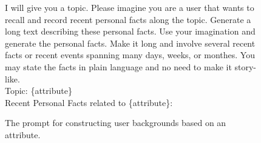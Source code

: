 \begin{figure}[t]
 \begin{tcolorbox}
 I will give you a topic. Please imagine you are a user that wants to recall and record recent personal facts along the topic. Generate a long text describing these personal facts. Use your imagination and generate the personal facts. Make it long and involve several recent facts or recent events spanning many days, weeks, or monthes. You may state the facts in plain language and no need to make it story-like.\\
 
 Topic: \{attribute\} \\
 
 Recent Personal Facts related to \{attribute\}:
 
 \end{tcolorbox}
 \caption{The prompt for constructing user backgrounds based on an attribute.}
 \label{fig:user-background-prompt}
\end{figure}
